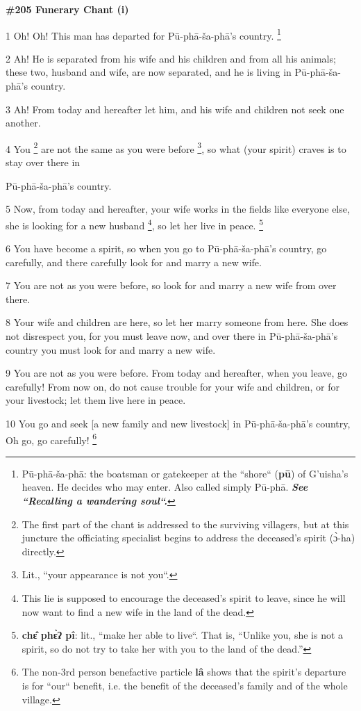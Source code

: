 
\textbf{\#205 Funerary Chant (i)}

1 Oh! Oh! This man has departed for Pū-phā-ša-phā's country. \footnote{Pū-phā-ša-phā: the boatsman or gatekeeper at the ``shore`` (\textbf{pū}) of G'uisha's heaven. He decides who may enter. Also called simply Pū-phā. \textit{\textbf{See ``Recalling a wandering soul``.}}}

2 Ah! He is separated from his wife and his children and from all his animals;
these two, husband and wife, are now separated, and he is living in Pū-phā-ša-phā's
country.

3 Ah! From today and hereafter let him, and his wife and children not seek one
another.

4 You \footnote{The first part of the chant is addressed to the surviving villagers, but at this juncture the officiating specialist begins to address the deceased's spirit (ɔ̀-ha) directly.} are not the same as you were before \footnote{Lit., ``your appearance is not you``.}, so what (your spirit) craves
is to stay over there in

Pū-phā-ša-phā's country.

5 Now, from today and hereafter, your wife works in the fields like everyone else,
she is looking for a new husband \footnote{This lie is supposed to encourage the deceased's spirit to leave, since he will now want to find a new wife in the land of the dead.}, so let her live in peace. \footnote{\textbf{chɛ̂ phɛ̀ʔ pî}:  lit., ``make her able to live``. That is, ``Unlike you, she is not a spirit, so do not try to take her with you to the land of the dead.''}

6 You have become a spirit, so when you go to Pū-phā-ša-phā's country, go
carefully, and there carefully look for and marry a new wife.

7 You are not as you were before, so look for and marry a new wife from over there.

8 Your wife and children are here, so let her marry someone from here. She does
not disrespect you, for you must leave now, and over there in Pū-phā-ša-phā's
country you must look for and marry a new wife.

9 You are not as you were before. From today and hereafter, when you leave, go
carefully! From now on, do not cause trouble for your wife and children, or for
your livestock; let them live here in peace.

10 You go and seek [a new family and new livestock] in Pū-phā-ša-phā's country,
Oh go, go carefully! \footnote{The non-3rd person benefactive particle\textbf{ lâ }shows that the spirit's departure is for ``our`` benefit, i.e. the benefit of the deceased's family and of the whole village.}

